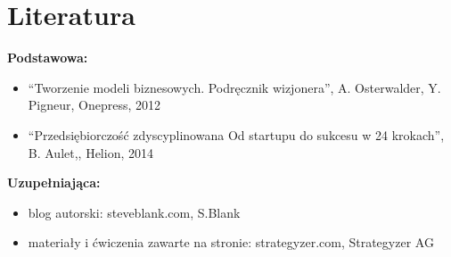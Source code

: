 \documentclass[12pt, a4paper]{article}
\begin{document}
\section{Literatura}

\textbf{Podstawowa:}
\begin{itemize}
  \item “Tworzenie modeli biznesowych. Podręcznik wizjonera”, A. Osterwalder, Y. Pigneur, Onepress, 2012
  \item “Przedsiębiorczość zdyscyplinowana Od startupu do sukcesu w 24 krokach”, B. Aulet,, Helion, 2014
\end{itemize}

\textbf{Uzupełniająca:}
\begin{itemize}
  \item blog autorski: steveblank.com, S.Blank
  \item materiały i ćwiczenia zawarte na stronie: strategyzer.com, Strategyzer AG
\end{itemize}
\end{document}
